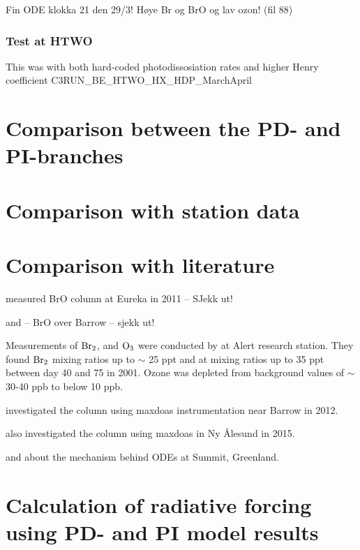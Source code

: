 Fin ODE klokka 21 den 29/3! Høye Br og BrO og lav ozon! (fil 88) 


\subsubsection{Test at HTWO}

This was with both hard-coded photodissosiation rates and higher Henry coefficient C3RUN\_BE\_HTWO\_HX\_HDP\_MarchApril

\section{Comparison between the PD- and PI-branches}

\section{Comparison with station data}

\section{Comparison with literature}

\cite{Zhao2016} measured BrO column at Eureka in 2011 -- SJekk ut! 


\cite{Peterson2016} and \cite{Peterson2015} -- BrO over Barrow -- sjekk ut! 

Measurements of $\mathrm{Br_2}$,  and $\mathrm{O_3}$ were conducted by \cite{Foster2001} at Alert research station. They found $\mathrm{Br_2}$ mixing ratios up to $\sim$ 25 \acrshort{ppt} and  at mixing ratios up to 35 \acrshort{ppt} between day 40 and 75 in 2001. Ozone was depleted from background values of $\sim$ 30-40 \acrshort{ppb} to below 10 ppb. 

\medskip

\cite{Simpson2017} investigated the  column using \acrlong{maxdoas} instrumentation near Barrow in 2012.

\medskip

\cite{Luo2018} also investigated the  column using \acrshort{maxdoas} in Ny Ålesund in 2015. 

\medskip

\cite{Thomas2012} and \cite{Thomas2011} about the mechanism behind ODEs at Summit, Greenland. 

\section{Calculation of radiative forcing using PD- and PI model results}